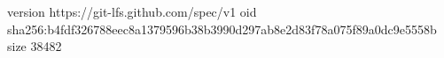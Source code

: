 version https://git-lfs.github.com/spec/v1
oid sha256:b4fdf326788eec8a1379596b38b3990d297ab8e2d83f78a075f89a0dc9e5558b
size 38482
